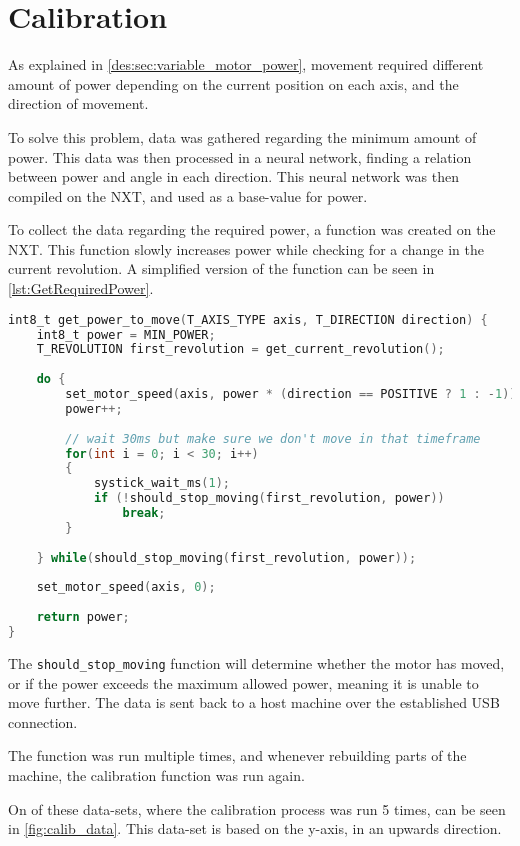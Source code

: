 \section{Calibration}
As explained in \autoref{des:sec:variable_motor_power}, movement required different amount of power depending on the current position on each axis, and the direction of movement.


To solve this problem, data was gathered regarding the minimum amount of power.
This data was then processed in a neural network, finding a relation between power and angle in each direction.
This neural network was then compiled on the NXT, and used as a base-value for power.

To collect the data regarding the required power, a function was created on the NXT.
This function slowly increases power while checking for a change in the current revolution. 
A simplified version of the function can be seen in \autoref{lst:GetRequiredPower}.


\begin{lstlisting}[language=C,label={lst:GetRequiredPower},caption={Getting required power to move }]
int8_t get_power_to_move(T_AXIS_TYPE axis, T_DIRECTION direction) {
	int8_t power = MIN_POWER;
	T_REVOLUTION first_revolution = get_current_revolution();
	
	do {
		set_motor_speed(axis, power * (direction == POSITIVE ? 1 : -1));
		power++;
		
		// wait 30ms but make sure we don't move in that timeframe
		for(int i = 0; i < 30; i++)
		{
			systick_wait_ms(1);
			if (!should_stop_moving(first_revolution, power))
				break;
		}
	
	} while(should_stop_moving(first_revolution, power));
	
	set_motor_speed(axis, 0);
	
	return power;
}

\end{lstlisting}

The \texttt{should\_stop\_moving} function will determine whether the motor has moved, or if the power exceeds the maximum allowed power, meaning it is unable to move further.
The data is sent back to a host machine over the established USB connection.

The function was run multiple times, and whenever rebuilding parts of the machine, the calibration function was run again.

On of these data-sets, where the calibration process was run 5 times, can be seen in \autoref{fig:calib_data}.
This data-set is based on the y-axis, in an upwards direction.


